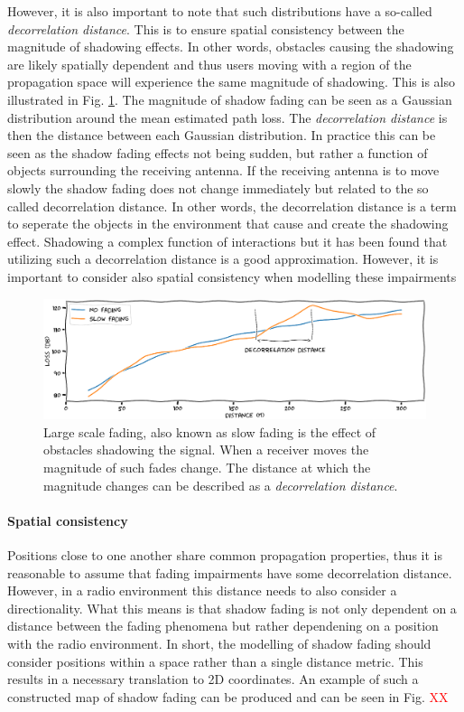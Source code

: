 However, it is also important to note that such distributions have a so-called \emph{decorrelation distance}. This is to ensure spatial consistency between the magnitude of shadowing effects. In other words, obstacles causing the shadowing are likely spatially dependent and thus users moving with a region of the propagation space will experience the same magnitude of shadowing. This is also illustrated in Fig. \ref{fig:shadowing_decorrelation_distance}. The magnitude of shadow fading can be seen as a Gaussian distribution around the mean estimated path loss. The \emph{decorrelation distance} is then the distance between each Gaussian distribution. In practice this can be seen as the shadow fading effects not being sudden, but rather a function of objects surrounding the receiving antenna. If the receiving antenna is to move slowly the shadow fading does not change immediately but related to the so called decorrelation distance. In other words, the decorrelation distance is a term to seperate the objects in the environment that cause and create the shadowing effect. Shadowing a complex function of interactions but it has been found that utilizing such a decorrelation distance is a good approximation. However, it is important to consider also spatial consistency when modelling these impairments


\begin{figure}[h]
    \centering
    \includegraphics{chapters/part_pathloss/figures/slowfading.eps}
    \caption{Large scale fading, also known as slow fading is the effect of obstacles shadowing the signal. When a receiver moves  the magnitude of such fades change. The distance at which the magnitude changes can be described as a \emph{decorrelation distance}.}
    \label{fig:shadowing_decorrelation_distance}
\end{figure}



\paragraph{Spatial consistency}
Positions close to one another share common propagation properties, thus it is reasonable to assume that fading impairments have some decorrelation distance. However, in a radio environment this distance needs to also consider a directionality. What this means is that shadow fading is not only dependent on a distance between the fading phenomena but rather dependening on a position with the radio environment. In short, the modelling of shadow fading should consider positions within a space rather than a single distance metric. This results in a necessary translation to 2D coordinates. An example of such a constructed map of shadow fading can be produced and can be seen in Fig. \textcolor{red}{XX}


